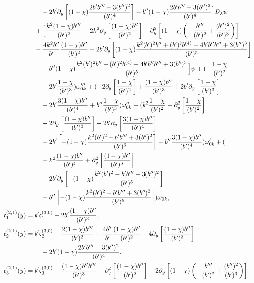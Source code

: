 \documentclass[reqno,11pt]{amsart}
\numberwithin{equation}{section}
\numberwithin{equation}{section} %
\begin{document}
\begin{enumerate}
\begin{align}
 &\quad -2b'\partial_y\left[(1-\chi)\frac{2b'b'''-3(b'')^2}{(b')^4}\right] -b''(1-\chi)\frac{2b'b'''-3(b'')^2}{(b')^4}\Bigr]D_\lambda\psi \notag\\
 &+\Bigl[\frac{k^2(1-\chi)b'''}{(b')^2} -2k^2\partial_y\left[\frac{(1-\chi)b''}{(b')^2}\right] -\partial_y^2\left[(1-\chi)\left(-\frac{b'''}{(b')^2}+\frac{(b'')^2}{(b')^3}\right)\right] \notag\\
 &-\frac{4k^2b''}{b'}\frac{(1-\chi)b''}{(b')^2} -2b'\partial_y\left[(1-\chi)\frac{k^2(b')^2b''+(b')^2b^{(4)}-4b'b''b'''+3(b'')^3}{(b')^5}\right] \notag\\
 &\quad -b''(1-\chi)\frac{k^2(b')^2b''+(b')^2b^{(4)}-4b'b''b'''+3(b'')^3}{(b')^5}\Bigr]\psi +( -\frac{1-\chi}{(b')^2} \notag\\
 &\quad +2b'\frac{1-\chi}{(b')^3})\omega_{0k}''' +( -2\partial_y\left[\frac{1-\chi}{(b')^2}\right] +\frac{(1-\chi)b''}{(b')^3} +2b'\partial_y\left[\frac{1-\chi}{(b')^3}\right] \notag\\
 &\quad -2b'\frac{3(1-\chi)b''}{(b')^4} +b''\frac{1-\chi}{(b')^3})\omega_{0k}'' +(k^2\frac{1-\chi}{(b')^2} -\partial_y^2\left[\frac{1-\chi}{(b')^2}\right] \notag\\
 &\quad +2\partial_y\left[\frac{(1-\chi)b''}{(b')^3}\right] -2b'\partial_y\left[\frac{3(1-\chi)b''}{(b')^4}\right] \notag\\
 &\quad -2b'\left[-(1-\chi)\frac{k^2(b')^2-b'b'''+3(b'')^2}{(b')^5}\right] -b''\frac{3(1-\chi)b''}{(b')^4})\omega_{0k}' +( \notag\\
 &\quad -k^2\frac{(1-\chi)b''}{(b')^3} +\partial_y^2\left[\frac{(1-\chi)b''}{(b')^3}\right] \notag\\
 &\quad -2b'\partial_y\left[-(1-\chi)\frac{k^2(b')^2-b'b'''+3(b'')^2}{(b')^5}\right] \notag\\
 &\quad -b''\left[-(1-\chi)\frac{k^2(b')^2-b'b'''+3(b'')^2}{(b')^5}\right])\omega_{0k}, \notag\\
 \mathfrak{c}_1^{(2,1)}(y)={}&b'\mathfrak{c}_1^{(3,0)} -2b'\frac{(1-\chi)b''}{(b')^3}, \notag\\
 \mathfrak{c}_2^{(2,1)}(y)={}&b'\mathfrak{c}_2^{(3,0)} -\frac{2(1-\chi)b'''}{(b')^2}+\frac{4b''}{b'}\frac{(1-\chi)b''}{(b')^2} +4\partial_y\left[\frac{(1-\chi)b''}{(b')^2}\right] \notag\\
 &\quad -2b'(1-\chi)\frac{2b'b'''-3(b'')^2}{(b')^4}, \notag\\
 \mathfrak{c}_3^{(2,1)}(y)={}&b'\mathfrak{c}_3^{(3,0)} -\frac{(1-\chi)b''b'''}{(b')^3} -\partial_y^2\left[\frac{(1-\chi)b''}{(b')^2}\right] -2\partial_y\left[(1-\chi)\left(-\frac{b'''}{(b')^2}+\frac{(b'')^2}{(b')^3}\right)\right] \notag\\

\end{align}
\end{enumerate}
\end{document}

